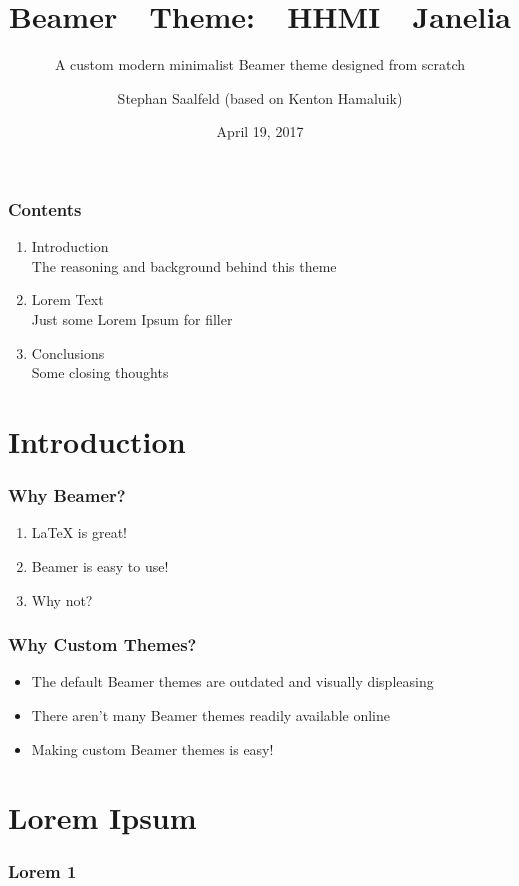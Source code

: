 \documentclass[aspectratio=169]{beamer}
\title[Janelia Theme]{Beamer~~Theme:~~HHMI~~Janelia}
\subtitle{A custom modern minimalist Beamer theme designed from scratch}
\author{Stephan Saalfeld (based on Kenton Hamaluik)}
\date{April 19, 2017}
\begin{document}
	\setcounter{showProgressBar}{0}
	\setcounter{showSlideNumbers}{0}

	\frame{\titlepage}

	\begin{frame}
		\frametitle{Contents}
		\begin{enumerate}
			\item Introduction \\ \textcolor{HHMIGrayB}{\footnotesize\hspace{1em} The reasoning and background behind this theme}
			\item Lorem Text  \\ \textcolor{HHMIGrayB}{\footnotesize\hspace{1em} Just some Lorem Ipsum for filler}
			\item Conclusions \\ \textcolor{HHMIGrayB}{\footnotesize\hspace{1em} Some closing thoughts}
		\end{enumerate}
	\end{frame}

	\setcounter{framenumber}{0}
	\setcounter{showProgressBar}{1}
	\setcounter{showSlideNumbers}{1}
	\section{Introduction}
		\begin{frame}
			\frametitle{Why Beamer?}
			\begin{enumerate}
				\item LaTeX is great!
				\item Beamer is easy to use!
				\item Why not?
			\end{enumerate}
		\end{frame}

		\begin{frame}
			\frametitle{Why Custom Themes?}
			\begin{itemize}
				\item The default Beamer themes are outdated and visually displeasing
				\item There aren't many Beamer themes readily available online
				\item Making custom Beamer themes is easy!
			\end{itemize}
		\end{frame}

	\section{Lorem Ipsum}
		\begin{frame}
			\frametitle{Lorem 1}
			\blindtext
		\end{frame}
\end{document}
